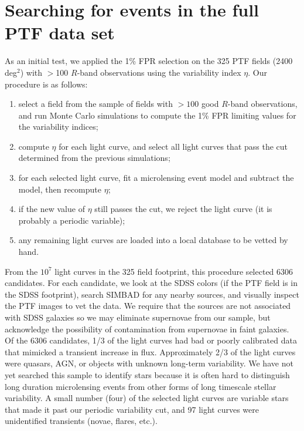 \documentclass[iop]{emulateapj}
\newcommand{\apwsim}{\raisebox{0.2ex}{\scriptsize$\sim$\normalsize}}
\begin{document}
\section{Searching for events in the full PTF data set}
As an initial test, we applied the 1\% FPR selection on the 325 PTF fields (\apwsim2400 deg$^2$) with $>$100 $R$-band observations using the variability index $\eta$. Our procedure is as follows:
\begin{enumerate}
	\item select a field from the sample of fields with $>100$ good $R$-band observations, and run Monte Carlo simulations to compute the 1\% FPR limiting values for the variability indices;
	\item compute $\eta$ for each light curve, and select all light curves that pass the cut determined from the previous simulations;
	\item for each selected light curve, fit a microlensing event model and subtract the model, then recompute $\eta$;
	\item if the new value of $\eta$ still passes the cut, we reject the light curve (it is probably a periodic variable);
	\item any remaining light curves are loaded into a local database to be vetted by hand.
\end{enumerate}

From the \apwsim$10^7$ light curves in the 325 field footprint, this procedure selected 6306 candidates. For each candidate, we look at the SDSS colors (if the PTF field is in the SDSS footprint), search SIMBAD for any nearby sources, and visually inspect the PTF images to vet the data. We require that the sources are not associated with SDSS galaxies so we may eliminate supernovae from our sample, but acknowledge the possibility of contamination from supernovae in faint galaxies. Of the 6306 candidates, \apwsim1/3 of the light curves had bad or poorly calibrated data that mimicked a transient increase in flux. Approximately 2/3 of the light curves were quasars, AGN, or objects with unknown long-term variability. We have not yet searched this sample to identify stars because it is often hard to distinguish long duration microlensing events from other forms of long timescale stellar variability. A small number (four) of the selected light curves are variable stars that made it past our periodic variability cut, and 97 light curves were unidentified transients (novae, flares, etc.). 
\end{document}
